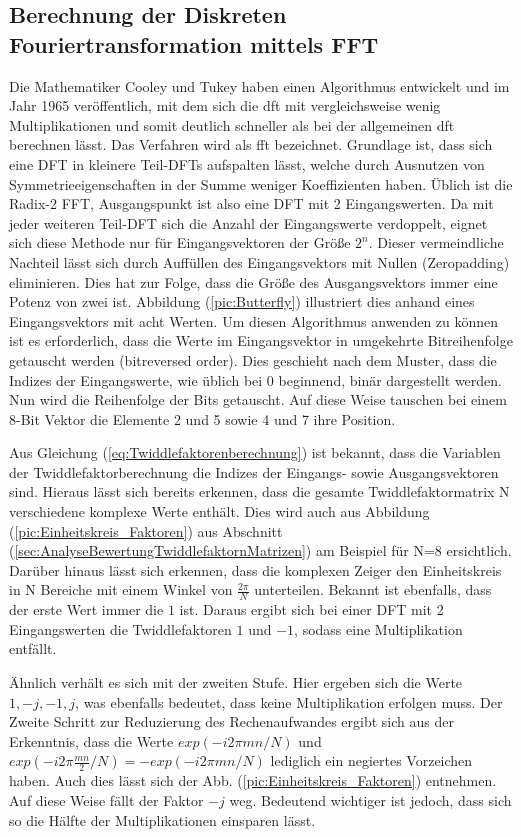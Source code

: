 \subsection{Berechnung der Diskreten Fouriertransformation mittels FFT}\label{sec:BerechnungFFT}
Die Mathematiker Cooley und Tukey haben einen Algorithmus entwickelt und im Jahr 1965 veröffentlich, mit dem sich die \gls{dft} mit vergleichsweise wenig Multiplikationen
und somit deutlich schneller als bei der allgemeinen \gls{dft} berechnen lässt. Das Verfahren wird als \gls{fft} bezeichnet.
Grundlage ist, dass sich eine DFT
in kleinere Teil-DFTs aufspalten lässt, welche durch Ausnutzen von Symmetrieeigenschaften in der Summe weniger Koeffizienten haben. 
Üblich ist die Radix-2 FFT, Ausgangspunkt ist also eine DFT mit 2 Eingangswerten.
Da mit jeder weiteren Teil-DFT sich die Anzahl der Eingangswerte verdoppelt, eignet sich diese Methode nur für Eingangsvektoren der Größe $2^n$. Dieser
vermeindliche Nachteil lässt sich durch Auffüllen des Eingangsvektors mit Nullen (Zeropadding) eliminieren. Dies hat zur Folge, dass die Größe des Ausgangsvektors
immer eine Potenz von zwei ist. Abbildung (\ref{pic:Butterfly}) illustriert dies anhand eines Eingangsvektors mit acht Werten. 
Um diesen Algorithmus anwenden zu können ist es erforderlich, dass die Werte im Eingangsvektor in umgekehrte Bitreihenfolge getauscht werden (bitreversed order).
Dies geschieht nach dem Muster, dass die Indizes der Eingangswerte, wie
üblich bei 0 beginnend, binär dargestellt werden. Nun wird die Reihenfolge der Bits getauscht. Auf diese Weise tauschen bei einem 8-Bit Vektor die
Elemente 2 und 5 sowie 4 und 7 ihre Position.

Aus Gleichung (\ref{eq:Twiddlefaktorenberechnung}) ist 
bekannt, dass die Variablen der Twiddlefaktorberechnung die Indizes der Eingangs- sowie Ausgangsvektoren sind. Hieraus lässt sich bereits erkennen, dass
die gesamte Twiddlefaktormatrix N verschiedene komplexe Werte enthält. Dies wird auch aus Abbildung (\ref{pic:Einheitskreis_Faktoren}) aus Abschnitt 
(\ref{sec:AnalyseBewertungTwiddlefaktornMatrizen}) am Beispiel für N=8 ersichtlich. Darüber hinaus lässt sich erkennen, dass die komplexen Zeiger den Einheitskreis 
in N Bereiche mit einem Winkel von $\frac{2 \pi}{N}$ unterteilen. Bekannt ist ebenfalls, dass der erste Wert immer die $1$ ist.
Daraus ergibt sich bei einer DFT mit 2 Eingangswerten die Twiddlefaktoren $1$ und $-1$, sodass eine Multiplikation entfällt. 

Ähnlich verhält es sich mit der zweiten Stufe.
Hier ergeben sich die Werte $1, -j, -1, j$, was ebenfalls bedeutet, dass keine Multiplikation erfolgen muss. Der Zweite Schritt zur Reduzierung des Rechenaufwandes ergibt sich
aus der Erkenntnis, dass die Werte $exp(-i 2 \pi m n/N)$ und $exp(-i 2 \pi \frac{m n}{2}/N) = -exp(-i 2 \pi m n/N)$ lediglich ein negiertes Vorzeichen haben. Auch dies lässt sich der Abb. 
(\ref{pic:Einheitskreis_Faktoren}) entnehmen. Auf diese Weise fällt der Faktor $-j$ weg. Bedeutend wichtiger ist jedoch, dass sich so die Hälfte der Multiplikationen einsparen lässt.

